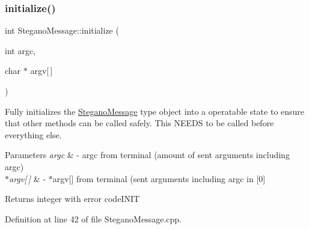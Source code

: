 \subsubsection{\texorpdfstring{initialize()}{initialize()}}
{\footnotesize\ttfamily int Stegano\+Message\+::initialize (\begin{DoxyParamCaption}\item[{int}]{argc,  }\item[{char $\ast$}]{argv\mbox{[}$\,$\mbox{]} }\end{DoxyParamCaption})}



Fully initializes the \mbox{\hyperlink{classSteganoMessage}{Stegano\+Message}} type object into a operatable state to ensure that other methods can be called safely. This N\+E\+E\+DS to be called before everything else. 


\begin{DoxyParams}{Parameters}
{\em argc} & -\/ argc from terminal (amount of sent arguments including argc) \\
\hline
{\em $\ast$argv\mbox{[}$\,$\mbox{]}} & -\/ $\ast$argv\mbox{[}\mbox{]} from terminal (sent arguments including argc in \mbox{[}0\mbox{]} \\
\hline
\end{DoxyParams}
\begin{DoxyReturn}{Returns}
integer with error code\+I\+N\+IT 
\end{DoxyReturn}


Definition at line 42 of file Stegano\+Message.\+cpp.

